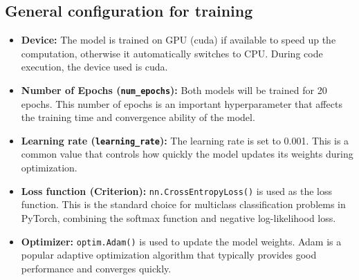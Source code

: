 \documentclass[12pt]{article}
\begin{document}
\subsection{General configuration for training}
\begin{itemize}
    \item \textbf{Device:} The model is trained on GPU (cuda) if available to speed up the computation, otherwise it automatically switches to CPU. During code execution, the device used is cuda.
    \item \textbf{Number of Epochs (\texttt{num\_epochs}):} Both models will be trained for 20 epochs. This number of epochs is an important hyperparameter that affects the training time and convergence ability of the model.
    \item \textbf{Learning rate (\texttt{learning\_rate}):} The learning rate is set to 0.001. This is a common value that controls how quickly the model updates its weights during optimization.
    \item \textbf{Loss function (Criterion):} \texttt{nn.CrossEntropyLoss()} is used as the loss function. This is the standard choice for multiclass classification problems in PyTorch, combining the softmax function and negative log-likelihood loss.
    \item \textbf{Optimizer:} \texttt{optim.Adam()} is used to update the model weights. Adam is a popular adaptive optimization algorithm that typically provides good performance and converges quickly.
\end{itemize}
\end{document}
